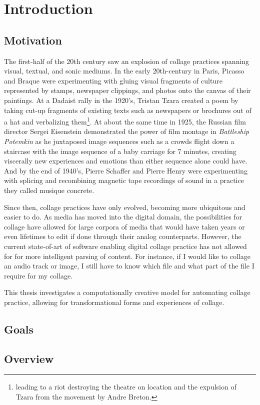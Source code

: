 \chapter{Introduction}
\label{chap:intro}
\minitoc

\section{Motivation}
The first-half of the 20th century saw an explosion of collage practices spanning visual, textual, and sonic mediums.  In the early 20th-century in Paris, Picasso and Braque were experimenting with gluing visual fragments of culture represented by stamps, newspaper clippings, and photos onto the canvas of their paintings.  At a Dadaist rally in the 1920's, Tristan Tzara created a poem by taking cut-up fragments of existing texts such as newspapers or brochures out of a hat and verbalizing them\footnote{leading to a riot destroying the theatre on location and the expulsion of Tzara from the movement by Andre Breton.}.  At about the same time in 1925, the Russian film director Sergei Eisenstein demonstrated the power of film montage in \textit{Battleship Potemkin} as he juxtaposed image sequences such as a crowds flight down a staircase with the image sequence of a baby carriage for 7 minutes, creating viscerally new experiences and emotions than either sequence alone could have.  And by the end of 1940's, Pierre Schaffer and Pierre Henry were experimenting with splicing and recombining magnetic tape recordings of sound in a practice they called musique concrete.  

Since then, collage practices have only evolved, becoming more ubiquitous and easier to do.  As media has moved into the digital domain, the possibilities for collage have allowed for large corpora of media that would have taken years or even lifetimes to edit if done through their analog counterparts.  However, the current state-of-art of software enabling digital collage practice has not allowed for for more intelligent parsing of content.  For instance, if I would like to collage an audio track or image, I still have to know which file and what part of the file I require for my collage.  

This thesis investigates a computationally creative model for automating collage practice, allowing for transformational forms and experiences of collage.  

\section{Goals}

\section{Overview}